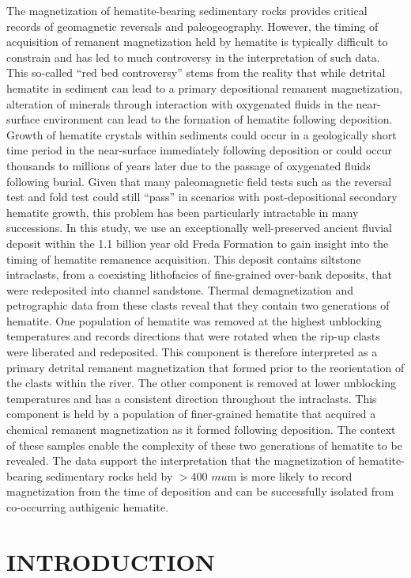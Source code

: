 \documentclass[11pt,letterpaper]{article}
\begin{document}
The magnetization of hematite-bearing sedimentary rocks provides critical records of geomagnetic reversals and paleogeography. However, the timing of acquisition of remanent magnetization held by hematite is typically difficult to constrain and has led to much controversy in the interpretation of such data. This so-called ``red bed controversy'' stems from the reality that while detrital hematite in sediment can lead to a primary depositional remanent magnetization, alteration of minerals through interaction with oxygenated fluids in the near-surface environment can lead to the formation of hematite following deposition. Growth of hematite crystals within sediments could occur in a geologically short time period in the near-surface immediately following deposition or could occur thousands to millions of years later due to the passage of oxygenated fluids following burial. Given that many paleomagnetic field tests such as the reversal test and fold test could still ``pass'' in scenarios with post-depositional secondary hematite growth, this problem has been particularly intractable in many successions. In this study, we use an exceptionally well-preserved ancient fluvial deposit within the 1.1 billion year old Freda Formation to gain insight into the timing of hematite remanence acquisition. This deposit contains siltstone intraclasts, from a coexisting lithofacies of fine-grained over-bank deposits, that were redeposited into channel sandstone. Thermal demagnetization and petrographic data from these clasts reveal that they contain two generations of hematite. One population of hematite was removed at the highest unblocking temperatures and records directions that were rotated when the rip-up clasts were liberated and redeposited. This component is therefore interpreted as a primary detrital remanent magnetization that formed prior to the reorientation of the clasts within the river. The other component is removed at lower unblocking temperatures and has a consistent direction throughout the intraclasts. This component is held by a population of finer-grained hematite that acquired a chemical remanent magnetization as it formed following deposition. The context of these samples enable the complexity of these two generations of hematite to be revealed. The data support the interpretation that the magnetization of hematite-bearing sedimentary rocks held by $>$400 $mu$m is more likely to record magnetization from the time of deposition and can be successfully isolated from co-occurring authigenic hematite.

\section*{INTRODUCTION}
\end{document}
